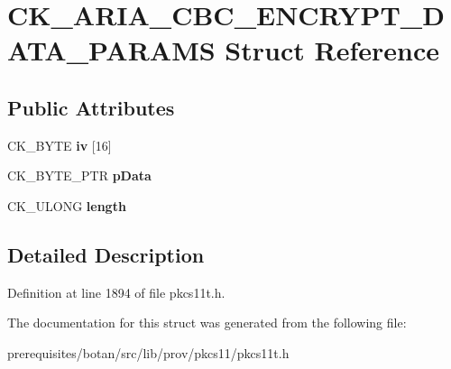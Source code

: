 \hypertarget{struct_c_k___a_r_i_a___c_b_c___e_n_c_r_y_p_t___d_a_t_a___p_a_r_a_m_s}{}\section{C\+K\+\_\+\+A\+R\+I\+A\+\_\+\+C\+B\+C\+\_\+\+E\+N\+C\+R\+Y\+P\+T\+\_\+\+D\+A\+T\+A\+\_\+\+P\+A\+R\+A\+MS Struct Reference}
\label{struct_c_k___a_r_i_a___c_b_c___e_n_c_r_y_p_t___d_a_t_a___p_a_r_a_m_s}
\subsection*{Public Attributes}
\begin{DoxyCompactItemize}
\item 
\mbox{\label{struct_c_k___a_r_i_a___c_b_c___e_n_c_r_y_p_t___d_a_t_a___p_a_r_a_m_s_acc009f272091e05095f5ccdeb09c9471}} 
C\+K\+\_\+\+B\+Y\+TE {\bfseries iv} \mbox{[}16\mbox{]}
\item 
\mbox{\label{struct_c_k___a_r_i_a___c_b_c___e_n_c_r_y_p_t___d_a_t_a___p_a_r_a_m_s_a453bfa7f583fe403750f16ec44c91299}} 
C\+K\+\_\+\+B\+Y\+T\+E\+\_\+\+P\+TR {\bfseries p\+Data}
\item 
\mbox{\label{struct_c_k___a_r_i_a___c_b_c___e_n_c_r_y_p_t___d_a_t_a___p_a_r_a_m_s_af1cb90e29189fac199d9d67400d1d03c}} 
C\+K\+\_\+\+U\+L\+O\+NG {\bfseries length}
\end{DoxyCompactItemize}


\subsection{Detailed Description}


Definition at line 1894 of file pkcs11t.\+h.



The documentation for this struct was generated from the following file\+:\begin{DoxyCompactItemize}
\item 
prerequisites/botan/src/lib/prov/pkcs11/pkcs11t.\+h\end{DoxyCompactItemize}
